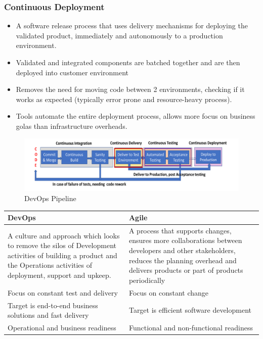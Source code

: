 \documentclass{article}
\begin{document}
\subsubsection{Continuous Deployment}
\begin{itemize}
    \item A software release process that uses delivery mechanisms for deploying the validated product, immediately and autonomously to a production environment.
    
    \item Validated and integrated components are batched together and are then deployed into customer environment
    
    \item Removes the need for moving code between 2 environments, checking if it works as expected (typically error prone and resource-heavy process). 
    
    \item Tools automate the entire deployment process, allows more focus on business golas than infrastructure overheads.
\end{itemize}
\begin{figure}[!h]
    \centering
    \includegraphics[scale=0.6]{p1.png}
    \caption{DevOps Pipeline}
    \label{fig:my_label}
\end{figure}
\begin{tabular}{|p{}|p{}|}
    \hline
    \textbf{DevOps} & \textbf{Agile}  \\
    \hline
    A culture and approach which looks to remove the silos of Development activities of building a product and the Operations activities of deployment, support and upkeep. & A process that supports changes, ensures more collaborations between developers and other stakeholders, reduces the planning overhead and delivers products or part of products periodically \\
    \hline
    Focus on constant test and delivery & Focus on constant change \\
    \hline
    Target is end-to-end business solutions and fast delivery & Target is efficient software development \\
    \hline 
    Operational and business readiness & Functional and non-functional readiness \\
    \hline
\end{tabular}
\end{document}
